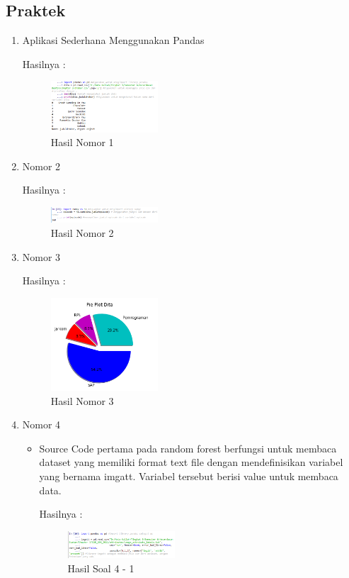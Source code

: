\subsection{Praktek}
\begin{enumerate}
\item Aplikasi Sederhana Menggunakan Pandas
\hfill\break
	
Hasilnya :
\begin{figure}[H]
		\includegraphics[width=4cm]{figures/1174054/3/4.png}
		\centering
		\caption{Hasil Nomor 1}
\end{figure}

\item Nomor 2
\hfill\break
	
Hasilnya :
\begin{figure}[H]
		\includegraphics[width=4cm]{figures/1174054/3/5.png}
		\centering
		\caption{Hasil Nomor 2}
\end{figure}

\item Nomor 3
\hfill\break
	
Hasilnya :
\begin{figure}[H]
		\includegraphics[width=4cm]{figures/1174054/3/6.png}
		\centering
		\caption{Hasil Nomor 3}
\end{figure}

\item Nomor 4
\hfill\break
\begin{itemize}
\item Source Code pertama pada random forest berfungsi untuk membaca dataset yang memiliki format text file dengan mendefinisikan variabel yang bernama imgatt. Variabel tersebut berisi value untuk membaca data. 

Hasilnya :
\begin{figure}[H]
	\centering
		\includegraphics[width=4cm]{figures/1174054/3/7.png}
		\caption{Hasil Soal 4 - 1}
\end{figure}
		

\end{itemize}
\end{enumerate}
